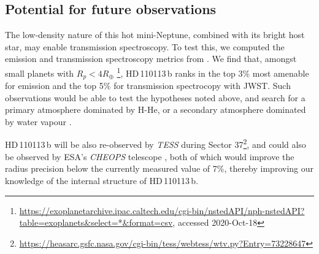 \documentclass[fleqn,usenatbib]{mnras}
\newcommand{\tess}{{\it TESS}}
\newcommand{\Tplanet}{HD\,110113\,b}
\begin{document}
\subsection{Potential for future observations}\label{sect:future}
The low-density nature of this hot mini-Neptune, combined with its bright host star, may enable transmission spectroscopy.
To test this, we computed the emission and transmission spectroscopy metrics from \citet{kempton2018framework}. 
We find that, amongst small planets with $R_p<4R_\oplus$ \citep{akeson2013nasa}\footnote{\url{https://exoplanetarchive.ipac.caltech.edu/cgi-bin/nstedAPI/nph-nstedAPI?table=exoplanets&select=*&format=csv}, accessed 2020-Oct-18}, \Tplanet{} ranks in the top 3\% most amenable for emission and the top 5\% for transmission spectrocopy with JWST.
Such observations would be able to test the hypotheses noted above, and search for a primary atmosphere dominated by H-He, or a secondary atmosphere dominated by water vapour \citep{2020arXiv201011867B}.

\Tplanet{} will be also re-observed by \tess{} during Sector 37\footnote{\url{https://heasarc.gsfc.nasa.gov/cgi-bin/tess/webtess/wtv.py?Entry=73228647}}, and could also be observed by ESA's \textit{CHEOPS} telescope \citep{benz2020cheops}, both of which would improve the radius precision below the currently measured value of 7\%, thereby improving our knowledge of the internal structure of \Tplanet{}.
\end{document}
